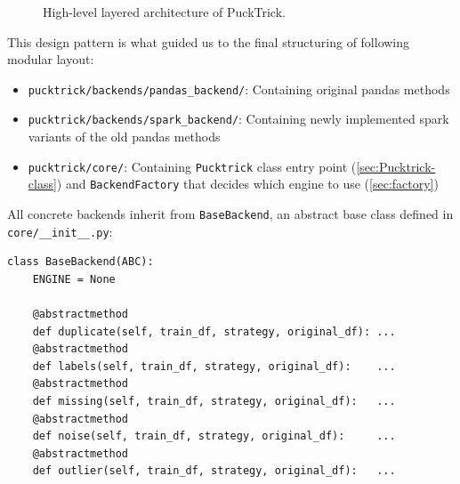 \documentclass[../main.tex]{subfiles}
\begin{document}
\begin{figure}[ht]
\centering
{}
\caption{High-level layered architecture of PuckTrick.}
\label{fig:layers}
\end{figure}


This design pattern is what guided us to the final structuring of following modular layout:
\begin{itemize}
  \item \texttt{pucktrick/backends/pandas\_backend/}: Containing original pandas methods
  \item \texttt{pucktrick/backends/spark\_backend/}: Containing newly implemented spark variants of the old pandas methods
  \item \texttt{pucktrick/core/}: Containing \texttt{Pucktrick} class entry point (\ref{sec:Pucktrick-class}) and \texttt{BackendFactory} that decides which engine to use (\ref{sec:factory})
\end{itemize}


All concrete backends inherit from \texttt{BaseBackend}, an abstract base
class defined in \texttt{core/\_\_init\_\_.py}:

    \begin{verbatim}
class BaseBackend(ABC):
    ENGINE = None

    @abstractmethod
    def duplicate(self, train_df, strategy, original_df): ...
    @abstractmethod
    def labels(self, train_df, strategy, original_df):    ...
    @abstractmethod
    def missing(self, train_df, strategy, original_df):   ...
    @abstractmethod
    def noise(self, train_df, strategy, original_df):     ...
    @abstractmethod
    def outlier(self, train_df, strategy, original_df):   ...
\end{verbatim}
\end{document}
